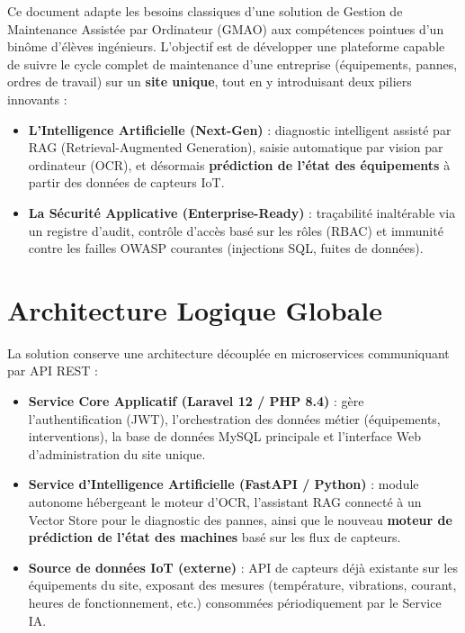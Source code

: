 \documentclass[11pt,a4paper]{article}
\begin{document}
Ce document adapte les besoins classiques d'une solution de Gestion de Maintenance Assistée par Ordinateur (GMAO) aux compétences pointues d'un binôme d'élèves ingénieurs. L'objectif est de développer une plateforme capable de suivre le cycle complet de maintenance d'une entreprise (équipements, pannes, ordres de travail) sur un \textbf{site unique}, tout en y introduisant deux piliers innovants :

\begin{itemize}
  \item \textbf{L'Intelligence Artificielle (Next-Gen)} : diagnostic intelligent assisté par RAG (Retrieval-Augmented Generation), saisie automatique par vision par ordinateur (OCR), et désormais \textbf{prédiction de l'état des équipements} à partir des données de capteurs IoT.
  \item \textbf{La Sécurité Applicative (Enterprise-Ready)} : traçabilité inaltérable via un registre d'audit, contrôle d'accès basé sur les rôles (RBAC) et immunité contre les failles OWASP courantes (injections SQL, fuites de données).
\end{itemize}

\section{Architecture Logique Globale}

La solution conserve une architecture découplée en microservices communiquant par API REST :

\begin{itemize}
  \item \textbf{Service Core Applicatif (Laravel 12 / PHP 8.4)} : gère l'authentification (JWT), l'orchestration des données métier (équipements, interventions), la base de données MySQL principale et l'interface Web d'administration du site unique.
  \item \textbf{Service d'Intelligence Artificielle (FastAPI / Python)} : module autonome hébergeant le moteur d'OCR, l'assistant RAG connecté à un Vector Store pour le diagnostic des pannes, ainsi que le nouveau \textbf{moteur de prédiction de l'état des machines} basé sur les flux de capteurs.
  \item \textbf{Source de données IoT (externe)} : API de capteurs déjà existante sur les équipements du site, exposant des mesures (température, vibrations, courant, heures de fonctionnement, etc.) consommées périodiquement par le Service IA.
\end{itemize}
\end{document}
